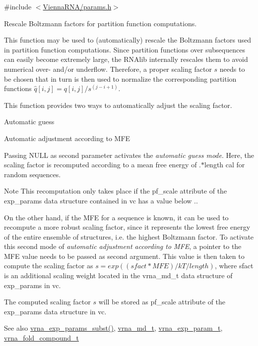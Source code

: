 {\ttfamily \#include $<$\hyperlink{params_8h}{Vienna\+R\+N\+A/params.\+h}$>$}



Rescale Boltzmann factors for partition function computations. 

This function may be used to (automatically) rescale the Boltzmann factors used in partition function computations. Since partition functions over subsequences can easily become extremely large, the R\+N\+Alib internally rescales them to avoid numerical over-\/ and/or underflow. Therefore, a proper scaling factor $s$ needs to be chosen that in turn is then used to normalize the corresponding partition functions $\hat{q}[i,j] = q[i,j] / s^{(j-i+1)}$.

This function provides two ways to automatically adjust the scaling factor.
\begin{DoxyEnumerate}
\item Automatic guess
\item Automatic adjustment according to M\+FE
\end{DoxyEnumerate}

Passing {\ttfamily N\+U\+LL} as second parameter activates the {\itshape automatic guess mode}. Here, the scaling factor is recomputed according to a mean free energy of {.$\ast$length} cal for random sequences. \begin{DoxyNote}{Note}
This recomputation only takes place if the {\ttfamily pf\+\_\+scale} attribute of the {\ttfamily exp\+\_\+params} data structure contained in {\ttfamily vc} has a value below {.}.
\end{DoxyNote}
On the other hand, if the M\+FE for a sequence is known, it can be used to recompute a more robust scaling factor, since it represents the lowest free energy of the entire ensemble of structures, i.\+e. the highest Boltzmann factor. To activate this second mode of {\itshape automatic adjustment according to M\+FE}, a pointer to the M\+FE value needs to be passed as second argument. This value is then taken to compute the scaling factor as $ s = exp((sfact * MFE) / kT / length )$, where sfact is an additional scaling weight located in the vrna\+\_\+md\+\_\+t data structure of {\ttfamily exp\+\_\+params} in {\ttfamily vc}.

The computed scaling factor $s$ will be stored as {\ttfamily pf\+\_\+scale} attribute of the {\ttfamily exp\+\_\+params} data structure in {\ttfamily vc}.

\begin{DoxySeeAlso}{See also}
\hyperlink{group__energy__parameters_ga8e7ac4fab3b0cc03afbc134eaafb3525}{vrna\+\_\+exp\+\_\+params\+\_\+subst()}, \hyperlink{group__model__details_ga1f8a10e12a0a1915f2a4eff0b28ea17c}{vrna\+\_\+md\+\_\+t}, \hyperlink{group__energy__parameters_ga01d8b92fe734df8d79a6169482c7d8d8}{vrna\+\_\+exp\+\_\+param\+\_\+t}, \hyperlink{group__fold__compound_ga1b0cef17fd40466cef5968eaeeff6166}{vrna\+\_\+fold\+\_\+compound\+\_\+t}
\end{DoxySeeAlso}


